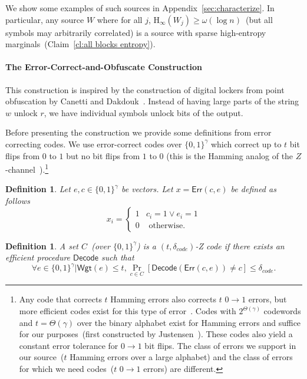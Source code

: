 \documentclass[11pt]{article}
\newtheorem{definition}[theorem]{Definition}
\newcommand{\apref}[1]{\mbox{Appendix~\ref{#1}}}
\newcommand{\clref}[1]{\mbox{Claim~\ref{#1}}}
\newcommand{\class}[1]{{\ensuremath{\mathsf{#1}}}}
\newcommand{\zo}{\ensuremath{\{0, 1\}}}
\newcommand{\error}{\ensuremath{\class{Err}}\xspace}
\newcommand{\weight}{\ensuremath{\class{Wgt}}\xspace}
\newcommand{\decode}{\ensuremath{\mathsf{Decode}}}
\newcommand{\Hoo}{\mathrm{H}_\infty}
\begin{document}
We show some examples of such sources in \apref{sec:characterize}.  In particular, any source $W$ where for all $j$, $\Hoo(W_j) \geq \omega(\log n)$~(but all symbols may arbitrarily correlated) is a source with sparse high-entropy marginals~(\clref{cl:all blocks entropy}).


\paragraph{The Error-Correct-and-Obfuscate Construction}
This construction is inspired by the construction of digital lockers from point obfuscation by Canetti and Dakdouk~\cite{canetti2008obfuscating}.  Instead of having large parts of the string $w$ unlock $r$, we have individual symbols unlock bits of the output.  

Before presenting the construction we provide some definitions from error correcting codes.
We use error-correct codes over $\{0,1\}^\gamma$ which correct up to $t$ bit flips from $0$ to $1$ but no bit flips from $1$ to $0$ (this is the Hamming analog of the $Z$-channel~\cite{tallini2002capacity}).\footnote{Any code that corrects $t$ Hamming errors also corrects $t$ $0\rightarrow 1$ errors, but more efficient codes  exist for this type of error~\cite{tallini2002capacity}.
Codes with $2^{\Theta(\gamma)}$ codewords and $t = \Theta(\gamma)$ over the binary alphabet exist for Hamming errors and suffice for our purposes~(first constructed by Justensen~\cite{justesen1972class}).  These codes also yield a constant error tolerance for $0\rightarrow 1$ bit flips.
The class of errors we support in our source~($t$ Hamming errors over a large alphabet) and the class of errors for which we need codes~($t$ $0\rightarrow 1$ errors) are different.
}
\begin{definition}
\label{def:hamming z channel}
Let $e, c\in \zo^\gamma$ be vectors.  Let $x = \error(c, e)$ be defined as follows
\[x_i = \begin{cases} 1 & c_i=1 \vee e_i=1\\
0& \text{ otherwise}.\end{cases}\]
\end{definition}

\begin{definition}
A set $C$~(over $\zo^\gamma$) is a $(t, \delta_{code})$-Z code if there exists an efficient procedure $\decode$ such that \[\forall e \in \zo^\gamma | \weight(e)\le t, \Pr_{c\in C}[\decode(\error(c,e)) \neq c] \leq \delta_{code}.\]
\end{definition}
\end{document}
